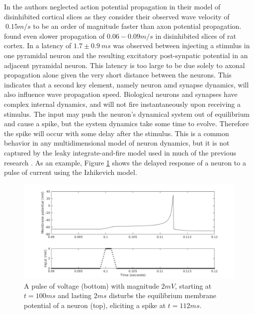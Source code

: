 \documentclass[12pt]{article}
\begin{document}
\color{red}In \parencite{Golomb1997} the authors neglected action potential propagation in their model of disinhibited cortical slices as they consider their observed wave velocity of $~0.15 m/s$ to be an order of magnitude faster than axon potential propagation.
\parencite{Chervin1988} found even slower propagation of $0.06-0.09 m/s$ in disinhibited slices of rat cortex.
In  \parencite{Markram1997} a latency of $1.7\pm 0.9\ ms$ was observed between injecting a stimulus in one pyramidal neuron and the resulting excitatory post-synpatic potential in an adjacent pyramidal neuron.
This latency is too large to be due solely to axonal propagation alone given the very short distance between the neurons. 
This indicates that a second key element, namely neuron amd synapse dynamics, will also influence wave propagation speed\color{black}.
Biological neurons \color{red}and synapses \color{black} have complex internal dynamics, and will not fire instantaneously upon receiving a stimulus.
The input may push the neuron's dynamical system out of equilibrium and cause a spike, but the system dynamics take some time to evolve.
Therefore the spike will occur with some delay after the stimulus.
This is a common behavior in any multidimensional model of neuron dynamics, but it is not captured by the leaky integrate-and-fire model used in much of the previous research \parencite{keane2015}\parencite{Senk2020}.
As an example, Figure \ref{fig:delay_neuronstep} shows the delayed response of a neuron to a pulse of current using the Izhikevich model.
\begin{figure}[!htb]
 \caption{ A pulse of voltage (bottom) with magnitude $2 mV$, starting at $t=100 ms$ and lasting $2 ms$ disturbs the equilibrium membrane potential of a neuron (top), eliciting a spike at $t=112 ms$. }
 \label{fig:delay_neuronstep}
 \centering
   \includegraphics[width=\textwidth]{fig/WaveSpeed_NeuronStepTest}
\end{figure}
\end{document}
